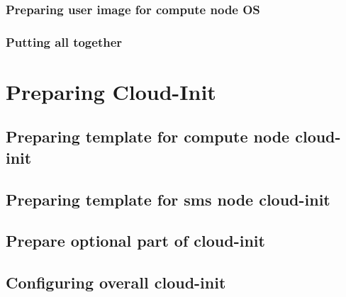 \documentclass[letterpaper]{article}
\begin{document}
\subsubsection{Preparing user image for compute node OS}\label{sec:compute_node_images}


\subsubsection{Putting all together }\label{sec:compute_node_images_all_together}



\clearpage

\section{Preparing Cloud-Init} \label{sec:cloud-init_prep}



\subsection{Preparing template for compute node cloud-init} \label{sec:c_i-template_compute_node}



\subsection{Preparing template for sms node cloud-init} \label{sec:c_i-template-sms-node}

	

\subsection{Prepare optional part of cloud-init} \label{sec:c_i-optional}



\subsection{Configuring overall cloud-init} \label{sec:c_i-config}
\end{document}
